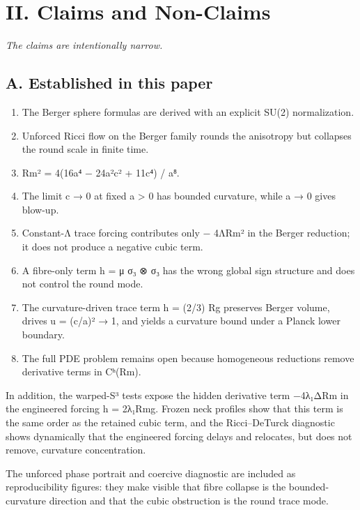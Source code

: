 \documentclass[
]{article}
\begin{document}
\section{II. Claims and Non-Claims}\label{ii.-claims-and-non-claims}

\emph{The claims are intentionally narrow.}

\subsection{A. Established in this paper}\label{a.-established-in-this-paper}

\begin{enumerate}
\def\labelenumi{(\arabic{enumi})}
\item
  The Berger sphere formulas are derived with an explicit SU(2) normalization.
\item
  Unforced Ricci flow on the Berger family rounds the anisotropy but collapses the round scale in finite time.
\item
  \textbar Rm\textbar² = 4(16a⁴ − 24a²c² + 11c⁴) / a⁸.
\item
  The limit c → 0 at fixed a \textgreater{} 0 has bounded curvature, while a → 0 gives blow-up.
\item
  Constant-Λ trace forcing contributes only − 4Λ\textbar Rm\textbar² in the Berger reduction; it does not produce a negative cubic term.
\item
  A fibre-only term h = μ σ₃ ⊗ σ₃ has the wrong global sign structure and does not control the round mode.
\item
  The curvature-driven trace term h = (2/3) Rg preserves Berger volume, drives u = (c/a)² → 1, and yields a curvature bound under a Planck lower boundary.
\item
  The full PDE problem remains open because homogeneous reductions remove derivative terms in Cʰ(Rm).
\end{enumerate}

In addition, the warped-S³ tests expose the hidden derivative term −4λ₁Δ\textbar Rm\textbar{} in the engineered forcing h = 2λ₁\textbar Rm\textbar g. Frozen neck profiles show that this term is the same order as the retained cubic term, and the Ricci--DeTurck diagnostic shows dynamically that the engineered forcing delays and relocates, but does not remove, curvature concentration.

The unforced phase portrait and coercive diagnostic are included as reproducibility figures: they make visible that fibre collapse is the bounded-curvature direction and that the cubic obstruction is the round trace mode.
\end{document}
